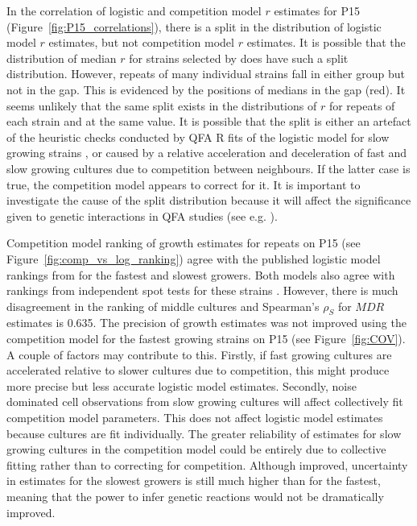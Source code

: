 In the correlation of logistic and competition model \(r\) estimates
for P15 (Figure~\ref{fig:P15_correlations}), there is a split in the
distribution of logistic model \(r\) estimates, but not competition
model \(r\) estimates. It is possible that the distribution of median
\(r\) for strains selected by \citet{Addinall2011} does have such a
split distribution. However, repeats of many individual strains fall
in either group but not in the gap. This is evidenced by the positions
of medians in the gap (red). It seems unlikely that the same split
exists in the distributions of \(r\) for repeats of each strain and at
the same value. It is possible that the split is either an artefact of
the heuristic checks conducted by QFA R fits of the logistic model for
slow growing strains \citep{qfa2016}, or caused by a relative
acceleration and deceleration of fast and slow growing cultures due to
competition between neighbours. If the latter case is true, the
competition model appears to correct for it. It is important to
investigate the cause of the split distribution because it will affect
the significance given to genetic interactions in QFA studies (see
e.g. \citet{Addinall2011}).

Competition model ranking of growth estimates for repeats on P15 (see
Figure~\ref{fig:comp_vs_log_ranking}) agree with the published
logistic model rankings from \citet{Addinall2011} for the fastest and
slowest growers. Both models also agree with rankings from independent
spot tests for these strains
\citep{maringele2002exo1,zubko2004exo1,Holstein20141259,foster2006mrx}. However,
there is much disagreement in the ranking of middle cultures and
Spearman's \(\rho_{S}\) for \(MDR\) estimates is 0.635. The precision
of growth estimates was not improved using the competition model for
the fastest growing strains on P15 (see Figure~\ref{fig:COV}). A
couple of factors may contribute to this. Firstly, if fast growing
cultures are accelerated relative to slower cultures due to
competition, this might produce more precise but less accurate
logistic model estimates. Secondly, noise dominated cell observations
from slow growing cultures will affect collectively fit competition
model parameters. This does not affect logistic model estimates
because cultures are fit individually. The greater reliability of
estimates for slow growing cultures in the competition model could be
entirely due to collective fitting rather than to correcting for
competition. Although improved, uncertainty in estimates for the
slowest growers is still much higher than for the fastest, meaning
that the power to infer genetic reactions would not be dramatically
improved.

